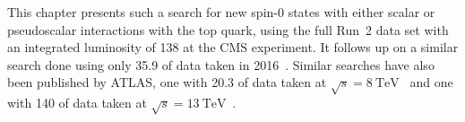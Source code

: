 




This chapter presents such a search for new spin-0 states with either scalar or pseudoscalar interactions with the top quark, using the full Run~2 data set with an integrated luminosity of \SI{138}{\fbinv} at the CMS experiment. It follows up on a similar search done using only \SI{35.9}{\fbinv} of data taken in 2016~\cite{CMS:HIG-17-027}. Similar searches have also been published by ATLAS, one with \SI{20.3}{\fbinv} of data taken at $\sqrt{s}=\SI{8}{\TeV}$~\cite{ATLAS:2017snw} and one with \SI{140}{\fbinv} of data taken at $\sqrt{s}=\SI{13}{\TeV}$~\cite{ATLAS:2024vxm}.

